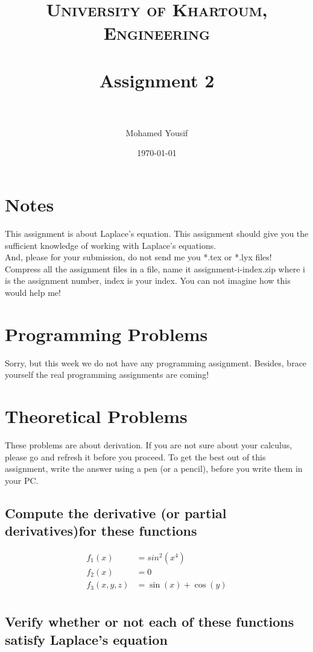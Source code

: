 \documentclass[paper=a4, fontsize=11pt]{scrartcl} %
\title{	
\normalfont \normalsize 
\textsc{University of Khartoum, Engineering} \\ [25pt] %
\horrule{0.5pt} \\[0.4cm] %
\huge Assignment 2 \\ %
\horrule{2pt} \\[0.5cm] %
}
\author{Mohamed Yousif} %
\date{\normalsize\today} %
\numberwithin{equation}{section} %
\numberwithin{figure}{section} %
\numberwithin{table}{section} %
\begin{document}
\maketitle %


\section*{Notes}
This assignment is about Laplace's equation. This assignment should give you the sufficient knowledge of working with Laplace's equations.\\
And, please for your submission, do not send me you *.tex or *.lyx files! Compress all the assignment files in a file, name it assignment-i-index.zip where i is the assignment number, index is your index. You can not imagine how this would help me!

\section{Programming Problems}
Sorry, but this week we do not have any programming assignment. Besides, brace yourself the real programming assignments are coming!

\section{Theoretical Problems}
These problems are about derivation. If you are not sure about your calculus, please go and refresh it before you proceed. To get the best out of this assignment, write the answer using a pen (or a pencil), before you write them in your PC.

\subsection{Compute the derivative (or partial derivatives)for these functions}

\begin{align}
	f_1(x) &= sin ^ 2(x ^ 4)\\
	f_2(x) &= 0\\
	f_3(x,y,z) &= \sin(x) + \cos(y)\\
\end{align}

\subsection{Verify whether or not each of these functions satisfy Laplace's equation}
\end{document}
